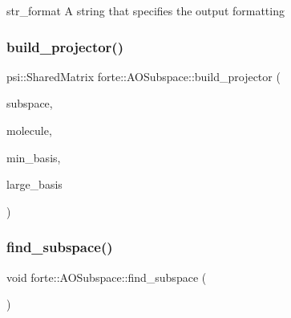 \begin{DoxyItemize}
\item str\+\_\+format A string that specifies the output formatting \end{DoxyItemize}
\mbox{\label{classforte_1_1_a_o_subspace_a516076d13d5f32ac3d50fdeffc66bfa9}} 
\subsubsection{\texorpdfstring{build\+\_\+projector()}{build\_projector()}}
{\footnotesize\ttfamily psi\+::\+Shared\+Matrix forte\+::\+A\+O\+Subspace\+::build\+\_\+projector (\begin{DoxyParamCaption}\item[{const std\+::vector$<$ int $>$ \&}]{subspace,  }\item[{std\+::shared\+\_\+ptr$<$ psi\+::\+Molecule $>$}]{molecule,  }\item[{std\+::shared\+\_\+ptr$<$ psi\+::\+Basis\+Set $>$}]{min\+\_\+basis,  }\item[{std\+::shared\+\_\+ptr$<$ psi\+::\+Basis\+Set $>$}]{large\+\_\+basis }\end{DoxyParamCaption})}

\mbox{\label{classforte_1_1_a_o_subspace_aac4b4260b7081a4d1cdc6be0a96d3491}} 
\subsubsection{\texorpdfstring{find\+\_\+subspace()}{find\_subspace()}}
{\footnotesize\ttfamily void forte\+::\+A\+O\+Subspace\+::find\+\_\+subspace (\begin{DoxyParamCaption}{ }\end{DoxyParamCaption})}

\mbox{\label{classforte_1_1_a_o_subspace_a25edf43d243fd8d8861b031e8b4bee27}} 
